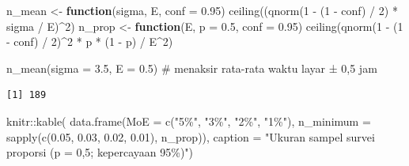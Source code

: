 \documentclass[
  indonesian,
  letterpaper,
]{book}
\newenvironment{Shaded}{\begin{snugshade}}{\end{snugshade}}
\newcommand{\AttributeTok}[1]{\textcolor[rgb]{0.40,0.45,0.13}{#1}}
\newcommand{\CommentTok}[1]{\textcolor[rgb]{0.37,0.37,0.37}{#1}}
\newcommand{\ControlFlowTok}[1]{\textcolor[rgb]{0.00,0.23,0.31}{\textbf{#1}}}
\newcommand{\DecValTok}[1]{\textcolor[rgb]{0.68,0.00,0.00}{#1}}
\newcommand{\FloatTok}[1]{\textcolor[rgb]{0.68,0.00,0.00}{#1}}
\newcommand{\FunctionTok}[1]{\textcolor[rgb]{0.28,0.35,0.67}{#1}}
\newcommand{\NormalTok}[1]{\textcolor[rgb]{0.00,0.23,0.31}{#1}}
\newcommand{\OtherTok}[1]{\textcolor[rgb]{0.00,0.23,0.31}{#1}}
\newcommand{\SpecialCharTok}[1]{\textcolor[rgb]{0.37,0.37,0.37}{#1}}
\newcommand{\StringTok}[1]{\textcolor[rgb]{0.13,0.47,0.30}{#1}}
\begin{document}
\begin{Shaded}
\begin{Highlighting}[]
\NormalTok{n\_mean }\OtherTok{\textless{}{-}} \ControlFlowTok{function}\NormalTok{(sigma, E, }\AttributeTok{conf =} \FloatTok{0.95}\NormalTok{)}
  \FunctionTok{ceiling}\NormalTok{((}\FunctionTok{qnorm}\NormalTok{(}\DecValTok{1} \SpecialCharTok{{-}}\NormalTok{ (}\DecValTok{1} \SpecialCharTok{{-}}\NormalTok{ conf) }\SpecialCharTok{/} \DecValTok{2}\NormalTok{) }\SpecialCharTok{*}\NormalTok{ sigma }\SpecialCharTok{/}\NormalTok{ E)}\SpecialCharTok{\^{}}\DecValTok{2}\NormalTok{)}
\NormalTok{n\_prop }\OtherTok{\textless{}{-}} \ControlFlowTok{function}\NormalTok{(E, }\AttributeTok{p =} \FloatTok{0.5}\NormalTok{, }\AttributeTok{conf =} \FloatTok{0.95}\NormalTok{)}
  \FunctionTok{ceiling}\NormalTok{(}\FunctionTok{qnorm}\NormalTok{(}\DecValTok{1} \SpecialCharTok{{-}}\NormalTok{ (}\DecValTok{1} \SpecialCharTok{{-}}\NormalTok{ conf) }\SpecialCharTok{/} \DecValTok{2}\NormalTok{)}\SpecialCharTok{\^{}}\DecValTok{2} \SpecialCharTok{*}\NormalTok{ p }\SpecialCharTok{*}\NormalTok{ (}\DecValTok{1} \SpecialCharTok{{-}}\NormalTok{ p) }\SpecialCharTok{/}\NormalTok{ E}\SpecialCharTok{\^{}}\DecValTok{2}\NormalTok{)}

\FunctionTok{n\_mean}\NormalTok{(}\AttributeTok{sigma =} \FloatTok{3.5}\NormalTok{, }\AttributeTok{E =} \FloatTok{0.5}\NormalTok{)   }\CommentTok{\# menaksir rata{-}rata waktu layar ± 0,5 jam}
\end{Highlighting}
\end{Shaded}

\begin{verbatim}
[1] 189
\end{verbatim}

\begin{Shaded}
\begin{Highlighting}[]
\NormalTok{knitr}\SpecialCharTok{::}\FunctionTok{kable}\NormalTok{(}
  \FunctionTok{data.frame}\NormalTok{(}\AttributeTok{MoE =} \FunctionTok{c}\NormalTok{(}\StringTok{"5\%"}\NormalTok{, }\StringTok{"3\%"}\NormalTok{, }\StringTok{"2\%"}\NormalTok{, }\StringTok{"1\%"}\NormalTok{),}
             \AttributeTok{n\_minimum =} \FunctionTok{sapply}\NormalTok{(}\FunctionTok{c}\NormalTok{(}\FloatTok{0.05}\NormalTok{, }\FloatTok{0.03}\NormalTok{, }\FloatTok{0.02}\NormalTok{, }\FloatTok{0.01}\NormalTok{), n\_prop)),}
  \AttributeTok{caption =} \StringTok{"Ukuran sampel survei proporsi (p = 0,5; kepercayaan 95\%)"}\NormalTok{)}
\end{Highlighting}
\end{Shaded}
\end{document}
